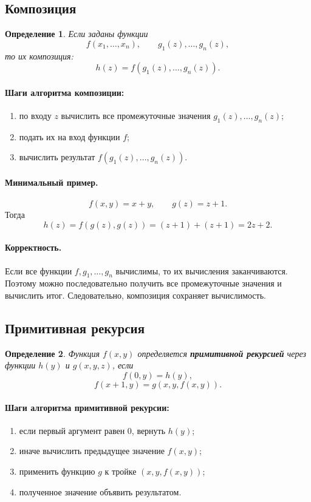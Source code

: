 \documentclass[12pt,a4paper]{article}
\newtheorem{definition}{Определение}
\begin{document}
\subsection{Композиция}
\begin{definition}
Если заданы функции
\[
f(x_1,\dots,x_n), \qquad g_1(z),\dots,g_n(z),
\]
то их композиция:
\[
h(z)=f(g_1(z),\dots,g_n(z)).
\]
\end{definition}

\paragraph{Шаги алгоритма композиции:}
\begin{enumerate}
    \item по входу $z$ вычислить все промежуточные значения $g_1(z),\dots,g_n(z)$;
    \item подать их на вход функции $f$;
    \item вычислить результат $f(g_1(z),\dots,g_n(z))$.
\end{enumerate}

\paragraph{Минимальный пример.}
\[
f(x,y)=x+y,\qquad g(z)=z+1.
\]
Тогда
\[
h(z)=f(g(z),g(z))=(z+1)+(z+1)=2z+2.
\]

\paragraph{Корректность.}
Если все функции $f,g_1,\dots,g_n$ вычислимы, то их вычисления заканчиваются. Поэтому можно последовательно получить все промежуточные значения и вычислить итог. Следовательно, композиция сохраняет вычислимость.

\subsection{Примитивная рекурсия}
\begin{definition}
Функция $f(x,y)$ определяется \textbf{примитивной рекурсией} через функции $h(y)$ и $g(x,y,z)$, если
\[
f(0,y)=h(y),
\]
\[
f(x+1,y)=g(x,y,f(x,y)).
\]
\end{definition}

\paragraph{Шаги алгоритма примитивной рекурсии:}
\begin{enumerate}
    \item если первый аргумент равен $0$, вернуть $h(y)$;
    \item иначе вычислить предыдущее значение $f(x,y)$;
    \item применить функцию $g$ к тройке $(x,y,f(x,y))$;
    \item полученное значение объявить результатом.
\end{enumerate}
\end{document}
